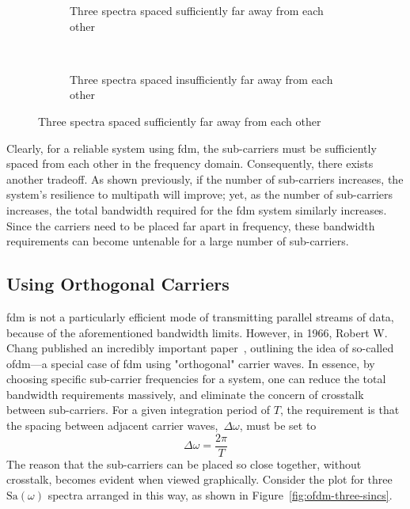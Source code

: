 \documentclass[class=report,11pt,crop=false]{standalone}
\begin{document}
\begin{figure}[htbp]
    \centering
    \captionsetup{type=figure}
    \begin{subfigure}[t]{0.58\textwidth}
        \centering
        \def\svgwidth{1\linewidth}
        { %
        \tiny
            }
        \caption{Three spectra spaced sufficiently far away from each other}
        \label{fig:three-sincs-good-distance}
    \end{subfigure}
    ~
    \begin{subfigure}[t]{0.4\textwidth}
        \centering
        \def\svgwidth{1\linewidth}
        { %
        \tiny
            }
        \caption{Three spectra spaced insufficiently far away from each other}
        \label{fig:three-sincs-bad-distance}
    \end{subfigure}%
    \caption{Three spectra spaced sufficiently far away from each other}
    \label{fig:three-sincs-good-and-bad}
\end{figure}

Clearly, for a reliable system using \gls{fdm}, the sub-carriers must be sufficiently spaced from each other in the frequency domain. Consequently, there exists another tradeoff. As shown previously, if the number of sub-carriers increases, the system's resilience to multipath will improve; yet, as the number of sub-carriers increases, the total bandwidth required for the \gls{fdm} system similarly increases. Since the carriers need to be placed far apart in frequency, these bandwidth requirements can become untenable for a large number of sub-carriers. 
  
\subsection{Using Orthogonal Carriers}
\gls{fdm} is not a particularly efficient mode of transmitting parallel streams of data, because of the aforementioned bandwidth limits. However, in 1966, Robert W. Chang published an incredibly important paper~\cite{Chang1966}, outlining the idea of so-called \gls{ofdm}---a special case of \gls{fdm} using "orthogonal" carrier waves. In essence, by choosing specific sub-carrier frequencies for a system, one can reduce the total bandwidth requirements massively, and eliminate the concern of crosstalk between sub-carriers. For a given integration period of \(T\), the requirement is that the spacing between adjacent carrier waves,~\(\Delta\omega\), must be set to
\begin{equation}
    \Delta \omega = \frac{2\pi}{T}
\end{equation}
The reason that the sub-carriers can be placed so close together, without crosstalk, becomes evident when viewed graphically. Consider the plot for three \(\mathrm{Sa}(\omega)\) spectra arranged in this way, as shown in Figure~\ref{fig:ofdm-three-sincs}.
\end{document}
